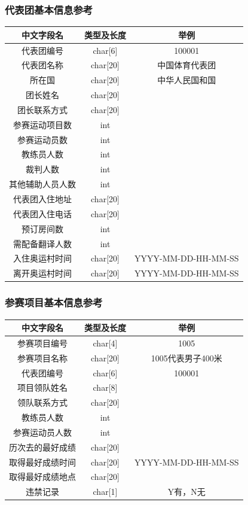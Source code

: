 \documentclass[10pt,a4paper]{article}
\begin{document}
\subsubsection{代表团基本信息参考}
\begin{tabular}{|c|c|c|}
  \hline
  中文字段名 &  类型及长度 & 举例\\
  \hline
  代表团编号 & char[6] & 100001 \\
  \hline
  代表团名称 & char[20] & 中国体育代表团 \\
  \hline
  所在国 & char[20] & 中华人民国和国 \\
  \hline
  团长姓名 & char[20] & ~ \\
  \hline
  团长联系方式 & char[20] & ~ \\
  \hline
  参赛运动项目数 & int & ~ \\
  \hline
  参赛运动员数 & int & ~ \\
  \hline
  教练员人数 & int & ~ \\
  \hline
  裁判人数 & int & ~ \\
  \hline
  其他辅助人员人数 & int & ~ \\
  \hline
  代表团入住地址 & char[20] & ~ \\
  \hline
  代表团入住电话 & char[20] & ~ \\
  \hline
  预订房间数 & int & ~ \\
  \hline
  需配备翻译人数 & int & ~ \\
  \hline
  入住奥运村时间 & char[20] & YYYY-MM-DD-HH-MM-SS \\
  \hline
  离开奥运村时间 & char[20] & YYYY-MM-DD-HH-MM-SS \\
  \hline
\end{tabular}

\subsubsection{参赛项目基本信息参考}

\begin{tabular}{|c|c|c|}
  \hline
  中文字段名 & 类型及长度& 举例\\
  \hline
  参赛项目编号 & char[4] & 1005 \\
  \hline
  参赛项目名称 & char[20] & 1005代表男子400米 \\
  \hline
  代表团编号 & char[6] & 100001 \\
  \hline
  项目领队姓名 & char[8] & \\
  \hline
  领队联系方式 & char[20]& \\
  \hline
  教练员人数 & int & \\
  \hline
  参赛运动员人数 & int & \\
  \hline
  历次去的最好成绩 & char[20] & \\
  \hline
  取得最好成绩时间 & char[20] & YYYY-MM-DD-HH-MM-SS \\
  \hline
  取得最好成绩地点 & char[20] & \\
  \hline
  违禁记录 & char[1] & Y有，N无 \\
  \hline
\end{tabular}
\end{document}
